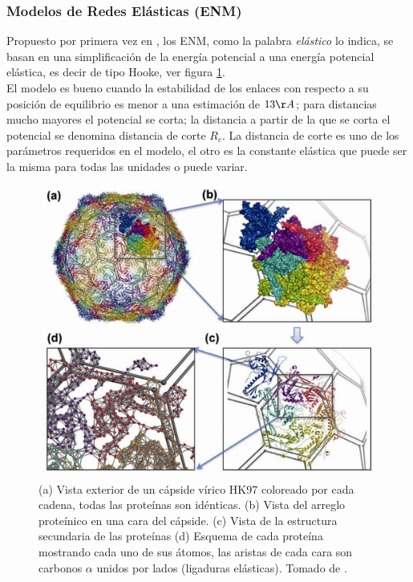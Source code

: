 \subsubsection{Modelos de Redes El\'{a}sticas (ENM)}
Propuesto por primera vez en \cite{Tirion1996}, los ENM, como la palabra \textit{el\'{a}stico} lo indica, se basan en una simplificaci\'{o}n de la energ\'{i}a potencial a una energ\'{i}a potencial el\'{a}stica, es decir de tipo Hooke, ver figura \ref{fig:pan}.\\



El modelo es bueno cuando la estabilidad de los enlaces con respecto a su posici\'{o}n de equilibrio es menor a una estimaci\'{o}n  de $13\AA$; para distancias mucho mayores el potencial se corta; la distancia a partir de la que se corta el potencial se denomina distancia de corte $R_c$. La distancia de corte es uno de los par\'{a}metros requeridos en el modelo, el otro es la constante el\'{a}stica que puede ser la misma para todas las unidades o puede variar.\\

\begin{figure}
\centering%
\includegraphics[scale=0.28]{Kap2/dibujo.pdf}%
\caption{ (a) Vista exterior de un c\'{a}pside v\'{i}rico HK97 coloreado por cada cadena, todas las prote\'{i}nas son id\'{e}nticas. (b) Vista del arreglo prote\'{i}nico en una cara del c\'{a}pside. (c) Vista de la estructura secundaria de las prote\'{i}nas (d) Esquema de cada prote\'{i}na mostrando cada uno de sus \'{a}tomos, las aristas de cada cara son carbonos $\alpha$ unidos por lados (ligaduras el\'{a}sticas). Tomado de \cite{Lezon2009}.} \label{fig:pan}
\end{figure}

